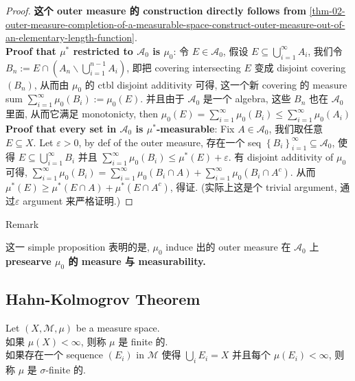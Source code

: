 \begin{proof}

\textbf{这个 outer measure 的 construction directly follows from} \ref{thm-02-outer-measure-completion-of-a-measurable-space-construct-outer-measure-out-of-an-elementary-length-function}.\\
\textbf{Proof that \(\mu^{\ast}\) restricted to \(\mathcal{A}_{0}\) is \(\mu_{0}\)}: 令 \(E \in \mathcal{A}_{0}\), 假设 \(E \subseteq \bigcup_{i = 1}^{\infty}A_{i}\), 我们令 \(B_{n} := E \cap (A_{n}\backslash\bigcup_{i = 1}^{n - 1}A_{i})\), 即把 covering intersecting \(E\) 变成 disjoint covering \((B_{n})\), 从而由 \(\mu_{0}\) 的 ctbl disjoint additivity 可得, 这一个新 covering 的 measure sum \(\sum_{i = 1}^{\infty}\mu_{0}(B_{i}) := \mu_{0}(E)\). 并且由于 \(\mathcal{A}_{0}\) 是一个 algebra, 这些 \(B_{n}\) 也在 \(\mathcal{A}_{0}\) 里面, 从而它满足 monotonicty, then \(\mu_{0}(E) = \sum_{i = 1}^{\infty}\mu_{0}(B_{i}) \leq \sum_{i = 1}^{\infty}\mu_{0}(A_{i})\)\\
\textbf{Proof that every set in \(\mathcal{A}_{0}\) is \(\mu^{\ast}\)-measurable}: Fix \(A \in \mathcal{A}_{0}\), 我们取任意 \(E \subseteq X\). Let \(\varepsilon > 0\), by def of the outer measure, 存在一个 seq \(\left\{ B_{i} \right\}_{i = 1}^{\infty} \subseteq \mathcal{A}_{0}\), 使得 \(E \subseteq \bigcup_{i = 1}^{\infty}B_{i}\) 并且 \(\sum_{i = 1}^{\infty}\mu_{0}(B_{i}) \leq \mu^{\ast}(E) + \varepsilon\). 有 disjoint additivity of \(\mu_{0}\) 可得, \(\sum_{i = 1}^{\infty}\mu_{0}(B_{i}) = \sum_{i = 1}^{\infty}\mu_{0}(B_{i} \cap A) + \sum_{i = 1}^{\infty}\mu_{0}(B_{i} \cap A^{c})\). 从而 \(\mu^{\ast}(E) \geq \mu^{\ast}(E \cap A) + \mu^{\ast}(E \cap A^{c})\), 得证. (实际上这是个 trivial argument, 通过\(\varepsilon\) argument 来严格证明.)

\end{proof}

\begin{qlremark}{Remark}

这一 simple proposition 表明的是, \(\mu_{0}\) induce 出的 outer measure 在 \(\mathcal{A}_{0}\) 上 \textbf{presearve \(\mu_{0}\) 的 measure 与 measurability.}

\end{qlremark}

\subsection{Hahn-Kolmogrov Theorem}\label{hahn-kolmogrov-theorem}

\begin{definition}{}

Let \((X,\mathcal{M},\mu)\) be a measure space.\\
如果 \(\mu(X) < \infty\), 则称 \(\mu\) 是 finite 的.\\
如果存在一个 sequence \((E_{i})\) in \(\mathcal{M}\) 使得 \(\bigcup_{i}E_{i} = X\) 并且每个 \(\mu(E_{i}) < \infty\), 则称 \(\mu\) 是 \(\sigma\)-finite 的.

\end{definition}

